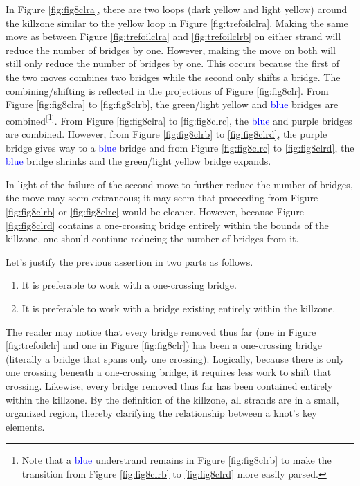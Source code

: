 \documentclass[titlepage]{article}
\begin{document}
In Figure \ref{fig:fig8clra}, there are two loops (\textcolor{yly}{dark yellow} and \textcolor{ylz}{light yellow}) around the killzone similar to the \textcolor{ylx}{yellow} loop in Figure \ref{fig:trefoilclra}. Making the same move as between Figure \ref{fig:trefoilclra} and \ref{fig:trefoilclrb} on either strand will reduce the number of bridges by one. However, making the move on both will still only reduce the number of bridges by one. This occurs because the first of the two moves combines two bridges while the second only shifts a bridge. The combining/shifting is reflected in the projections of Figure \ref{fig:fig8clr}. From Figure \ref{fig:fig8clra} to \ref{fig:fig8clrb}, the \textcolor{grx}{green}/\textcolor{ylz}{light yellow} and \textcolor{blue}{blue} bridges are combined$^[$\footnote{Note that a \textcolor{blue}{blue} understrand remains in Figure \ref{fig:fig8clrb} to make the transition from Figure \ref{fig:fig8clrb} to \ref{fig:fig8clrd} more easily parsed.}$^]$. From Figure \ref{fig:fig8clra} to \ref{fig:fig8clrc}, the \textcolor{blue}{blue} and \textcolor{pux}{purple} bridges are combined. However, from Figure \ref{fig:fig8clrb} to \ref{fig:fig8clrd}, the \textcolor{pux}{purple} bridge gives way to a \textcolor{blue}{blue} bridge and from Figure \ref{fig:fig8clrc} to \ref{fig:fig8clrd}, the \textcolor{blue}{blue} bridge shrinks and the \textcolor{grx}{green}/\textcolor{ylz}{light yellow} bridge expands.\par
In light of the failure of the second move to further reduce the number of bridges, the move may seem extraneous; it may seem that proceeding from Figure \ref{fig:fig8clrb} or \ref{fig:fig8clrc} would be cleaner. However, because Figure \ref{fig:fig8clrd} contains a one-crossing bridge entirely within the bounds of the killzone, one should continue reducing the number of bridges from it.\par
Let's justify the previous assertion in two parts as follows.

\begin{conj}
    \begin{enumerate}
        \item It is preferable to work with a one-crossing bridge.
        \item It is preferable to work with a bridge existing entirely within the killzone.
    \end{enumerate}
\end{conj}

The reader may notice that every bridge removed thus far (one in Figure \ref{fig:trefoilclr} and one in Figure \ref{fig:fig8clr}) has been a one-crossing bridge (literally a bridge that spans only one crossing). Logically, because there is only one crossing beneath a one-crossing bridge, it requires less work to shift that crossing. Likewise, every bridge removed thus far has been contained entirely within the killzone. By the definition of the killzone, all strands are in a small, organized region, thereby clarifying the relationship between a knot's key elements.
\end{document}
